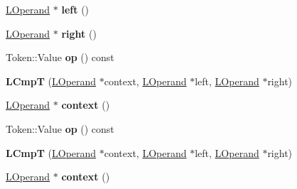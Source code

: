 \begin{DoxyCompactItemize}
\item 
\hyperlink{classv8_1_1internal_1_1_l_operand}{L\+Operand} $\ast$ {\bfseries left} ()\hypertarget{classv8_1_1internal_1_1_l_cmp_t_a6468d4b481e8c5ea5d268ad8b9bb0770}{}\label{classv8_1_1internal_1_1_l_cmp_t_a6468d4b481e8c5ea5d268ad8b9bb0770}

\item 
\hyperlink{classv8_1_1internal_1_1_l_operand}{L\+Operand} $\ast$ {\bfseries right} ()\hypertarget{classv8_1_1internal_1_1_l_cmp_t_a13a757622a5ddbff0584adc3b84baa8d}{}\label{classv8_1_1internal_1_1_l_cmp_t_a13a757622a5ddbff0584adc3b84baa8d}

\item 
Token\+::\+Value {\bfseries op} () const \hypertarget{classv8_1_1internal_1_1_l_cmp_t_affeb8a538e036a9115089631b13671f8}{}\label{classv8_1_1internal_1_1_l_cmp_t_affeb8a538e036a9115089631b13671f8}

\item 
{\bfseries L\+CmpT} (\hyperlink{classv8_1_1internal_1_1_l_operand}{L\+Operand} $\ast$context, \hyperlink{classv8_1_1internal_1_1_l_operand}{L\+Operand} $\ast$left, \hyperlink{classv8_1_1internal_1_1_l_operand}{L\+Operand} $\ast$right)\hypertarget{classv8_1_1internal_1_1_l_cmp_t_af9639e776ae4b34555d2d8b124fd06a2}{}\label{classv8_1_1internal_1_1_l_cmp_t_af9639e776ae4b34555d2d8b124fd06a2}

\item 
\hyperlink{classv8_1_1internal_1_1_l_operand}{L\+Operand} $\ast$ {\bfseries context} ()\hypertarget{classv8_1_1internal_1_1_l_cmp_t_a0beea53d13e064416006b17596aae2a1}{}\label{classv8_1_1internal_1_1_l_cmp_t_a0beea53d13e064416006b17596aae2a1}

\item 
Token\+::\+Value {\bfseries op} () const \hypertarget{classv8_1_1internal_1_1_l_cmp_t_affeb8a538e036a9115089631b13671f8}{}\label{classv8_1_1internal_1_1_l_cmp_t_affeb8a538e036a9115089631b13671f8}

\item 
{\bfseries L\+CmpT} (\hyperlink{classv8_1_1internal_1_1_l_operand}{L\+Operand} $\ast$context, \hyperlink{classv8_1_1internal_1_1_l_operand}{L\+Operand} $\ast$left, \hyperlink{classv8_1_1internal_1_1_l_operand}{L\+Operand} $\ast$right)\hypertarget{classv8_1_1internal_1_1_l_cmp_t_af9639e776ae4b34555d2d8b124fd06a2}{}\label{classv8_1_1internal_1_1_l_cmp_t_af9639e776ae4b34555d2d8b124fd06a2}

\item 
\hyperlink{classv8_1_1internal_1_1_l_operand}{L\+Operand} $\ast$ {\bfseries context} ()\hypertarget{classv8_1_1internal_1_1_l_cmp_t_a0beea53d13e064416006b17596aae2a1}{}\label{classv8_1_1internal_1_1_l_cmp_t_a0beea53d13e064416006b17596aae2a1}


\end{DoxyCompactItemize}
